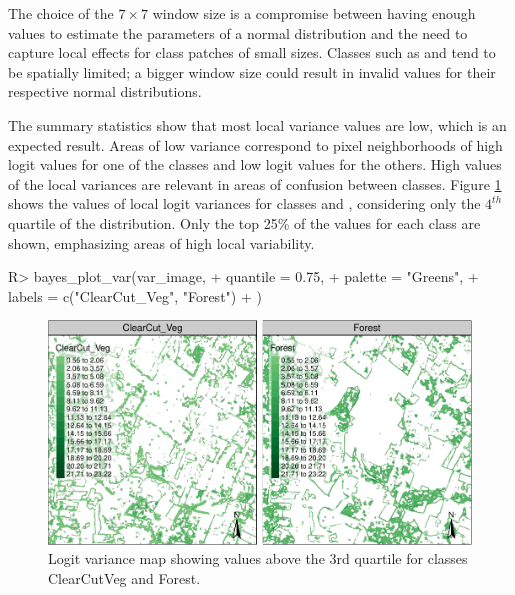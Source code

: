 \documentclass[
  shortnames]{jss}
\begin{document}
The choice of the \(7 \times 7\) window size is a compromise between having enough values to estimate the parameters of a normal distribution and the need to capture local effects for class patches of small sizes. Classes such as  and  tend to be spatially limited; a bigger window size could result in invalid values for their respective normal distributions.

The summary statistics show that most local variance values are low, which is an expected result. Areas of low variance correspond to pixel neighborhoods of high logit values for one of the classes and low logit values for the others. High values of the local variances are relevant in areas of confusion between classes. Figure \ref{fig:vcube} shows the values of local logit variances for classes  and , considering only the \(4^{th}\) quartile of the distribution. Only the top 25\% of the values for each class are shown, emphasizing areas of high local variability.

\begin{CodeChunk}
\begin{CodeInput}
R> bayes_plot_var(var_image,
+   quantile = 0.75,
+   palette = "Greens",
+   labels = c("ClearCut_Veg", "Forest")
+ )
\end{CodeInput}
\begin{figure}[h]

{\centering \includegraphics{Bayesian_smoothing_JSS_files/figure-latex/vcube-1} 

}

\caption[Logit variance map showing values above the 3rd quartile for classes ClearCutVeg and Forest]{Logit variance map showing values above the 3rd quartile for classes ClearCutVeg and Forest.}\label{fig:vcube}
\end{figure}
\end{CodeChunk}
\end{document}
